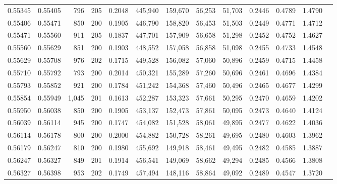 \begin{tabular}{rrrrrrrrrrrrr}
0.55345 & 0.55405 &   796 & 205 &                                     0.2048 & 445,940 & 159,670 &  56,253 &  51,703 & 0.2446 & 0.4789 & 1.4790 \\
0.55406 & 0.55471 &   850 & 200 &                                     0.1905 & 446,790 & 158,820 &  56,453 &  51,503 & 0.2449 & 0.4771 & 1.4712 \\
0.55471 & 0.55560 &   911 & 205 &                                     0.1837 & 447,701 & 157,909 &  56,658 &  51,298 & 0.2452 & 0.4752 & 1.4627 \\
0.55560 & 0.55629 &   851 & 200 &                                     0.1903 & 448,552 & 157,058 &  56,858 &  51,098 & 0.2455 & 0.4733 & 1.4548 \\
0.55629 & 0.55708 &   976 & 202 &                                     0.1715 & 449,528 & 156,082 &  57,060 &  50,896 & 0.2459 & 0.4715 & 1.4458 \\
0.55710 & 0.55792 &   793 & 200 &                                     0.2014 & 450,321 & 155,289 &  57,260 &  50,696 & 0.2461 & 0.4696 & 1.4384 \\
0.55793 & 0.55852 &   921 & 200 &                                     0.1784 & 451,242 & 154,368 &  57,460 &  50,496 & 0.2465 & 0.4677 & 1.4299 \\
0.55854 & 0.55949 & 1,045 & 201 &                                     0.1613 & 452,287 & 153,323 &  57,661 &  50,295 & 0.2470 & 0.4659 & 1.4202 \\
0.55950 & 0.56038 &   850 & 200 &                                     0.1905 & 453,137 & 152,473 &  57,861 &  50,095 & 0.2473 & 0.4640 & 1.4124 \\
0.56039 & 0.56114 &   945 & 200 &                                     0.1747 & 454,082 & 151,528 &  58,061 &  49,895 & 0.2477 & 0.4622 & 1.4036 \\
0.56114 & 0.56178 &   800 & 200 &                                     0.2000 & 454,882 & 150,728 &  58,261 &  49,695 & 0.2480 & 0.4603 & 1.3962 \\
0.56179 & 0.56247 &   810 & 200 &                                     0.1980 & 455,692 & 149,918 &  58,461 &  49,495 & 0.2482 & 0.4585 & 1.3887 \\
0.56247 & 0.56327 &   849 & 201 &                                     0.1914 & 456,541 & 149,069 &  58,662 &  49,294 & 0.2485 & 0.4566 & 1.3808 \\
0.56327 & 0.56398 &   953 & 202 &                                     0.1749 & 457,494 & 148,116 &  58,864 &  49,092 & 0.2489 & 0.4547 & 1.3720 \\

\end{tabular}
